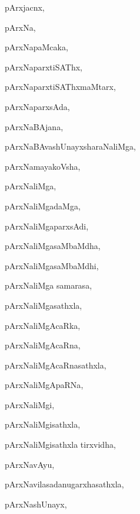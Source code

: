 \begin{multicols}{3}
{\noindent
{pArxjacnx}, \pageref{pArxjacnx}

\noindent
{pArxNa}, \pageref{pArxNa}

\noindent
{pArxNapaMcaka}, \pageref{pArxNapaMcaka}

\noindent
{pArxNaparxtiSAThx}, \pageref{pArxNaparxtiSAThx}

\noindent
{pArxNaparxtiSAThxmaMtarx}, \pageref{pArxNaparxtiSAThxmaMtarx}

\noindent
{pArxNaparxsAda}, \pageref{pArxNaparxsAda}

\noindent
{pArxNaBAjana}, \pageref{pArxNaBAjana}

\noindent
{pArxNaBAvashUnayxsharaNaliMga}, \pageref{pArxNaBAvashUnayxsharaNaliMga}

\noindent
{pArxNamayakoVsha}, \pageref{pArxNamayakoVsha}

\noindent
{pArxNaliMga}, \pageref{pArxNaliMga}

\noindent
{pArxNaliMgadaMga}, \pageref{pArxNaliMgadaMga}

\noindent
{pArxNaliMgaparxsAdi}, \pageref{pArxNaliMgaparxsAdi}

\noindent
{pArxNaliMgasaMbaMdha}, \pageref{pArxNaliMgasaMbaMdha}

\noindent
{pArxNaliMgasaMbaMdhi}, \pageref{pArxNaliMgasaMbaMdhi}

\noindent
{pArxNaliMga samarasa}, \pageref{pArxNaliMga samarasa}

\noindent
{pArxNaliMgasathxla}, \pageref{pArxNaliMgasathxla}

\noindent
{pArxNaliMgAcaRka}, \pageref{pArxNaliMgAcaRka}

\noindent
{pArxNaliMgAcaRna}, \pageref{pArxNaliMgAcaRna}

\noindent
{pArxNaliMgAcaRnasathxla}, \pageref{pArxNaliMgAcaRnasathxla}

\noindent
{pArxNaliMgApaRNa}, \pageref{pArxNaliMgApaRNa}

\noindent
{pArxNaliMgi}, \pageref{pArxNaliMgi}

\noindent
{pArxNaliMgisathxla}, \pageref{pArxNaliMgisathxla}

\noindent
{pArxNaliMgisathxla tirxvidha}, \pageref{pArxNaliMgisathxla tirxvidha}

\noindent
{pArxNavAyu}, \pageref{pArxNavAyu}

\noindent
{pArxNavilasadanugarxhasathxla}, \pageref{pArxNavilasadanugarxhasathxla}

\noindent
{pArxNashUnayx}, \pageref{pArxNashUnayx}

}
\end{multicols}
